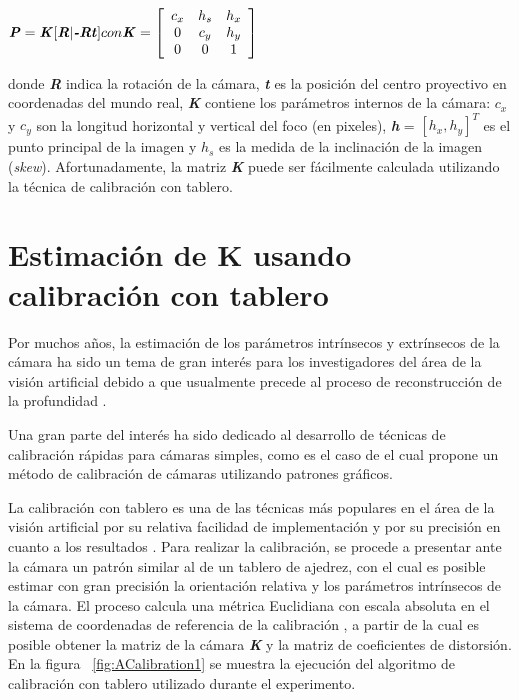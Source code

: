 \begin{center}
\vspace{5 mm}
$
\textbf{\textit{P}} = \textbf{\textit{K}}[\textbf{\textit{R}}|\textbf{\textit{-Rt}}] con \textbf{\textit{K}} = 
\left[ {
\begin{array}{*{20}c}
   c_x & h_s & h_x  \\
   0   & c_y & h_y  \\
   0   & 0   & 1    \\
\end{array} 
} \right]
$
\vspace{5 mm}
\end{center}

donde \textit{\textbf{R}} indica la rotaci\'{o}n de la c\'{a}mara, \textit{\textbf{t}} es la posici\'{o}n del centro proyectivo en coordenadas del mundo real, \textit{\textbf{K}} contiene los par\'{a}metros internos de la c\'{a}mara: \textit{$c_x$} y \textit{$c_y$} son la longitud horizontal y vertical del foco (en pixeles), \textit{\textbf{h}} = $[h_x,h_y]^T$ es el punto principal de la imagen y \textit{$h_s$} es la medida de la inclinaci\'{o}n de la imagen (\textit{skew}). Afortunadamente, la matriz \textbf{\textit{K}} puede ser f\'{a}cilmente calculada utilizando la t\'{e}cnica de calibraci\'{o}n con tablero.

\section{Estimaci\'{o}n de K usando calibraci\'{o}n con tablero}
Por muchos a\~nos, la estimaci\'{o}n de los par\'{a}metros intr\'{i}nsecos y extr\'{i}nsecos de la c\'{a}mara ha sido un tema de gran inter\'{e}s para los investigadores del \'{a}rea de la visi\'{o}n artificial debido a que usualmente precede al proceso de reconstrucci\'{o}n de la profundidad \cite{Cyganek_Siebert_2009,Maybank_Faugeras_1992,Tsai_R_Y_1987}.

Una gran parte del inter\'{e}s ha sido dedicado al desarrollo de t\'{e}cnicas de calibraci\'{o}n r\'{a}pidas para c\'{a}maras simples, como es el caso de \cite{Zhang_camcal_2004} el cual propone un m\'{e}todo de calibraci\'{o}n de c\'{a}maras utilizando patrones gr\'{a}ficos.

La calibraci\'{o}n con tablero es una de las t\'{e}cnicas m\'{a}s populares en el \'{a}rea de la visi\'{o}n artificial por su relativa facilidad de implementaci\'{o}n y por su precisi\'{o}n en cuanto a los resultados \cite{Szeliski_2010, Tsai_R_Y_1987}. Para realizar la calibraci\'{o}n, se procede a presentar ante la c\'{a}mara un patr\'{o}n similar al de un tablero de ajedrez, con el cual es posible estimar con gran precisi\'{o}n la orientaci\'{o}n relativa y los par\'{a}metros intr\'{i}nsecos de la c\'{a}mara. El proceso calcula una m\'{e}trica Euclidiana con escala absoluta en el sistema de coordenadas de referencia de la calibraci\'{o}n \cite{Jahne_Haubecker_Ray_2002}, a partir de la cual es posible obtener la matriz de la c\'{a}mara \textbf{\textit{K}} y la matriz de coeficientes de distorsi\'{o}n. En la figura ~\ref{fig:ACalibration1} se muestra la ejecuci\'{o}n del algoritmo de calibraci\'{o}n con tablero utilizado durante el experimento.


